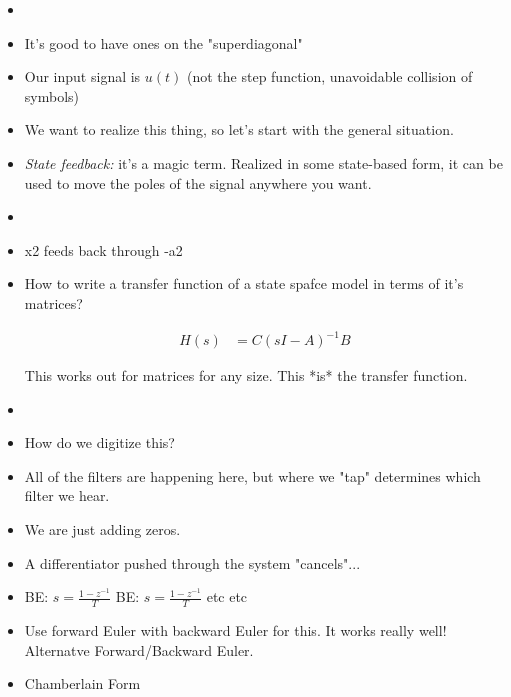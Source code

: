 \begin{itemize}
\item{
}
\item{
It's good to have ones on the "superdiagonal" 
}
\item{
Our input signal is $u(t)$ (not the step function, unavoidable collision of symbols)
}
\item{
We want to realize this thing, so let's start with the general situation. 
}
\item{
    \textit{State feedback:} it's a magic term. Realized in some state-based form, 
    it can be used to move the poles of the signal anywhere you want. 
}
\item{
}
\item{
    x2 feeds back through -a2
}
\item{
    How to write a transfer function of a state spafce model in terms of it's matrices?

    \begin{align*}
        H(s) &= C(sI - A)^{-1}B
    \end{align*}

    This works out for matrices for any size. This *is* the transfer function. 
}
\item{
}
\item{
    How do we digitize this? 
}
\item{
    All of the filters are happening here, but where we "tap" determines
which filter we hear. 
}
\item{
    We are just adding zeros. 
}
\item{
    A differentiator pushed through the system "cancels"... 
}
\item{
    BE: $s = \frac{1 - z^{-1}}{T} $
    BE: $s = \frac{1 - z^{-1}}{T} $
    etc etc 
}
\item{
    Use forward Euler with backward Euler for this. It works really well!
    Alternatve Forward/Backward Euler.
}
\item{
    Chamberlain Form
}
\end{itemize}
